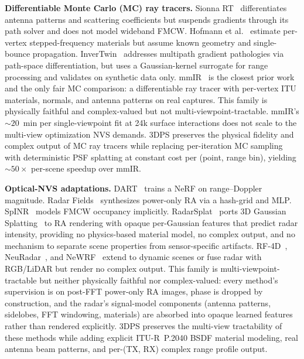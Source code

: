 \textbf{Differentiable Monte Carlo (MC) ray tracers.}
Sionna RT~\cite{sionna} differentiates antenna patterns and scattering coefficients but suspends gradients through its path solver and does not model wideband FMCW. Hofmann et al.~\cite{hofmann2025inverse} estimate per-vertex stepped-frequency materials but assume known geometry and single-bounce propagation. InverTwin~\cite{chen2025invertwin} addresses multipath gradient pathologies via path-space differentiation, but uses a Gaussian-kernel surrogate for range processing and validates on synthetic data only. mmIR~\cite{mmIR2026} is the closest prior work and the only fair MC comparison: a differentiable ray tracer with per-vertex ITU materials, normals, and antenna patterns on real captures. This family is physically faithful and complex-valued but not multi-viewpoint-tractable. mmIR's ${\sim}20$~min per single-viewpoint fit at 24k surface interactions does not scale to the multi-view optimization NVS demands. 3DPS preserves the physical fidelity and complex output of MC ray tracers while replacing per-iteration MC sampling with deterministic PSF splatting at constant cost per (point, range bin), yielding ${\sim}50\times$ per-scene speedup over mmIR.

\textbf{Optical-NVS adaptations.}
DART~\cite{huang2024dart} trains a NeRF on range--Doppler magnitude. Radar Fields~\cite{10.1145/3641519.3657510} synthesizes power-only RA via a hash-grid and MLP. SpINR~\cite{takawale2025spinr} models FMCW occupancy implicitly. RadarSplat~\cite{kung2025radarsplat} ports 3D Gaussian Splatting~\cite{3dgs} to RA rendering with opaque per-Gaussian features that predict radar intensity, providing no physics-based material model, no complex output, and no mechanism to separate scene properties from sensor-specific artifacts. RF-4D~\cite{zhang2025rf4d}, NeuRadar~\cite{rafidashti2025neuradar}, and NeWRF~\cite{lu2024newrf} extend to dynamic scenes or fuse radar with RGB/LiDAR but render no complex output. This family is multi-viewpoint-tractable but neither physically faithful nor complex-valued: every method's supervision is on post-FFT power-only RA images, phase is dropped by construction, and the radar's signal-model components (antenna patterns, sidelobes, FFT windowing, materials) are absorbed into opaque learned features rather than rendered explicitly. 3DPS preserves the multi-view tractability of these methods while adding explicit ITU-R~P.2040 BSDF material modeling, real antenna beam patterns, and per-(TX, RX) complex range profile output.
